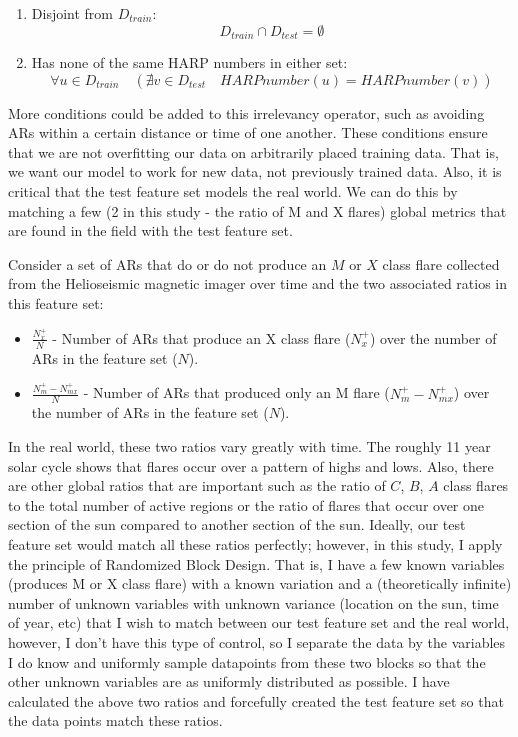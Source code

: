 \documentclass[defaultstyle,11pt]{thesis}
\begin{document}
\begin{enumerate}
    \item Disjoint from $D_{train}$:
    $$D_{train} \cap D_{test} = \emptyset$$
    \item Has none of the same HARP numbers in either set:
    $$\forall u \in D_{train} \quad (\nexists v \in D_{test} \quad HARP number(u) = HARP number(v))$$
\end{enumerate}

More conditions could be added to this irrelevancy operator, such as avoiding ARs within a certain distance or time of one another. These conditions ensure that we are not overfitting our data on arbitrarily placed training data. That is, we want our model to work for new data, not previously trained data. Also, it is critical that the test feature set models the real world. We can do this by matching a few (2 in this study - the ratio of M and X flares) global metrics that are found in the field with the test feature set. 

Consider a set of ARs that do or do not produce an $M$ or $X$ class flare collected from the Helioseismic magnetic imager over time and the two associated ratios in this feature set:
\begin{itemize}
    \item $\frac{N_x^+}{N}$ - Number of ARs that produce an X class flare ($N_x^+$) over the number of ARs in the feature set ($N$).
    \item $\frac{N_m^+ - N_{mx}^+}{N}$ - Number of ARs that produced only an M flare ($N_m^+ - N_{mx}^+$) over the number of ARs in the feature set ($N$).
\end{itemize}
In the real world, these two ratios vary greatly with time. The roughly 11 year solar cycle shows that flares occur over a pattern of highs and lows. Also, there are other global ratios that are important such as the ratio of $C$, $B$, $A$ class flares to the total number of active regions or the ratio of flares that occur over one section of the sun compared to another section of the sun. Ideally, our test feature set would match all these ratios perfectly; however, in this study, I apply the principle of Randomized Block Design. That is, I have a few known variables (produces M or X class flare) with a known variation and a (theoretically infinite) number of unknown variables with unknown variance (location on the sun, time of year, etc) that I wish to match between our test feature set and the real world, however, I don't have this type of control, so I separate the data by the variables I do know and uniformly sample datapoints from these two blocks so that the other unknown variables are as uniformly distributed as possible. I have calculated the above two ratios and forcefully created the test feature set so that the data points match these ratios. 
\end{document}

